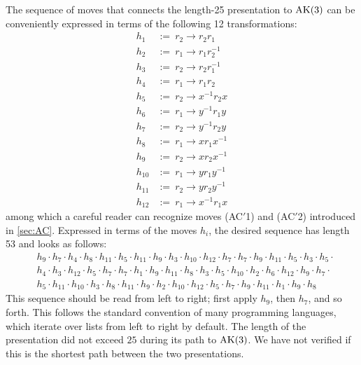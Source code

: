 The sequence of moves that connects the length-25 presentation to $\text{AK}(3)$ can be conveniently expressed in terms of the following 12 transformations:
\[
\begin{aligned}
h_1 &:= \  r_2 \rightarrow r_2 r_1 \\
h_2 &:= \ r_1 \rightarrow r_1 r_2^{-1} \\
h_3 &:= \ r_2 \rightarrow r_2 r_1^{-1} \\
h_4 &:= \ r_1 \rightarrow r_1 r_2 \\
h_5 &:= \ r_2 \rightarrow x^{-1} r_2 x \\
h_6 &:= \ r_1 \rightarrow y^{-1} r_1 y \\
h_7 &:= \ r_2 \rightarrow y^{-1} r_2 y \\
h_8 &:= \ r_1 \rightarrow x r_1 x^{-1} \\
h_9 &:= \ r_2 \rightarrow x r_2 x^{-1} \\
h_{10} &:= \ r_1 \rightarrow y r_1 y^{-1} \\
h_{11} &:= \ r_2 \rightarrow y r_2 y^{-1} \\
h_{12} &:= \ r_1 \rightarrow x^{-1} r_1 x
\end{aligned}
\]
among which a careful reader can recognize moves (AC$'$1) and (AC$'$2) introduced in \autoref{sec:AC}. Expressed in terms of the moves $h_i$, the desired sequence has length 53 and looks as follows:
\[
\begin{aligned}
& h_9 \cdot h_7 \cdot h_4 \cdot h_8 \cdot h_{11} \cdot h_5 \cdot h_{11} \cdot h_9 \cdot h_3 \cdot h_{10} \cdot h_{12} \cdot h_7 \cdot h_7 \cdot h_9 \cdot h_{11} \cdot h_5 \cdot h_3 \cdot h_5 \cdot \\
& h_4 \cdot h_3 \cdot h_{12} \cdot h_5 \cdot h_7 \cdot h_7 \cdot h_1 \cdot h_9 \cdot h_{11} \cdot h_8 \cdot h_3 \cdot h_5 \cdot h_{10} \cdot h_2 \cdot h_6 \cdot h_{12} \cdot h_9 \cdot h_7 \cdot \\
& h_5 \cdot h_{11} \cdot h_{10} \cdot h_3 \cdot h_8 \cdot h_{11} \cdot h_9 \cdot h_2 \cdot h_{10} \cdot h_{12} \cdot h_5 \cdot h_7 \cdot h_9 \cdot h_{11} \cdot h_1 \cdot h_9 \cdot h_8
\end{aligned}
\]
This sequence should be read from left to right; first apply $h_9$, then $h_7$, and so forth. This follows the standard convention of many programming languages, which iterate over lists from left to right by default. The length of the presentation did not exceed $25$ during its path to $\text{AK}(3)$. We have not verified if this is the shortest path between the two presentations.

